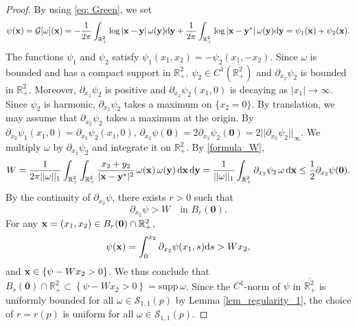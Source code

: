 \documentclass[11pt]{amsart}
\theoremstyle{definition}
\theoremstyle{definition}
\numberwithin{equation}{section}
\newcommand{\supp}{{\mathrm{supp}}\,}
\newcommand{\0}{\emptyset}
\newcommand{\bfx}{{\bf x}}
\newcommand{\bfy}{{\bf y}}
\newcommand{\bbR}{\mathbb R}
\newcommand{\calG}{\mathcal G}
\newcommand{\calS}{\mathcal S}
\newcommand{\dd}{\mathrm{d}}
\begin{document}
			
			\begin{proof}
				By using \eqref{eq: Green}, we set 
				\[
				\psi(\bfx)=\calG[\omega](\bfx) = - \frac{1}{2\pi}\int_{\mathbb{R}^2_+} \log|\bfx-\bfy| \,\omega(\bfy)   \dd \bfy + \frac{1}{2\pi} \int_{\mathbb{R}^2_+} \log|\bfx-\bfy^{*}| \, \omega(\bfy)   \dd \bfy=\psi_1(\bfx)+\psi_2(\bfx).
				\]
				The functions $\psi_1$ and $\psi_2$ satisfy $\psi_1(x_1,x_2)=-\psi_2(x_1,-x_2)$. Since $\omega$ is bounded and has a compact support in $\overline{\mathbb{R}^{2}_{+}}$, $\psi_2\in C^{1}(\overline{\mathbb{R}^{2}_{+}})$ and $\partial_{x_2}\psi_2$ is bounded in $\mathbb{R}^{2}_{+}$.
				Moreover, $\partial_{x_2}\psi_2$ is positive and $\partial_{x_2}\psi_2(x_1,0)$ is decaying as $|x_1|\to\infty$.
				Since $\psi_2$ is harmonic, $\partial_{x_2}\psi_2$ takes a maximum on $\{x_2=0\}$. By translation, we may assume that $\partial_{x_2}\psi_2$ takes a maximum at the origin.
				By $\partial_{x_2}\psi_1(x_1,0)=\partial_{x_2}\psi_2(x_1,0)$, $\partial_{x_2}\psi(\mathbf{0})=2\partial_{x_2}\psi_2(\mathbf{0})=2||\partial_{x_2}\psi_2||_{\infty}$. We multiply $\omega$ by $\partial_{x_2}\psi_2$ and integrate it on $\mathbb{R}^{2}_{+}$.
				By \eqref{formula_W}, 
				\begin{align*}
					W=\frac{1}{2\pi ||\omega||_{1}}\int_{\mathbb{R}^2_+} \int_{\mathbb{R}^2_+} 
					\frac{x_2 + y_2}{|\bfx - \bfy^*|^2}\, \omega(\bfx) \,\omega (\bfy) \,  \dd \bfx \, \dd \bfy
					=\frac{1}{||\omega||_{1}}\int_{\mathbb{R}^2_+}\partial_{x_2}\psi_2 \, \omega \, \dd \bfx
					\leq \frac{1}{2}\partial_{x_2}\psi (\mathbf{0}).
				\end{align*}
				By the continuity of $\partial_{x_2}\psi$, there exists $r>0$ such that 
				\[
				\partial_{x_2}\psi > W \quad \textrm{in} \,\, B_{r}(\mathbf{0}).
				\]
				For any $\bfx=(x_1,x_2)\in B_{r}(\mathbf{0}) \cap \bbR^2_+$, 
				\begin{align*}
					\psi(\bfx) = \int_{0}^{x_2} \partial_{x_2}\psi(x_1,s) \dd s > W x_2,    
				\end{align*}
				and $\bfx \in \{\psi - Wx_2 > 0\}$. We thus conclude that $B_{r}(\mathbf{0}) \cap \bbR^2_+ \subset  \left\{ \psi -Wx_2 > 0 \right\} = \supp \omega$. Since the $C^{1}$-norm of $\psi$ in $\overline{\mathbb{R}^{2}_{+}}$ is uniformly bounded for all $\omega\in \calS_{1,1}(p)$ by Lemma \ref{lem_regularity_1}, the choice of $r=r(p)$ is uniform for all $\omega\in \calS_{1,1}({p})$.
			\end{proof}
			
			
			
\end{document}
